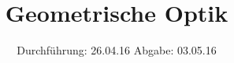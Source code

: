 

\subject{Versuch 408}
\title{Geometrische Optik}
\date{
  Durchführung: 26.04.16
  \hspace{3em}
  Abgabe: 03.05.16
}



\maketitle
\thispagestyle{empty}
\tableofcontents
\newpage






\printbibliography


